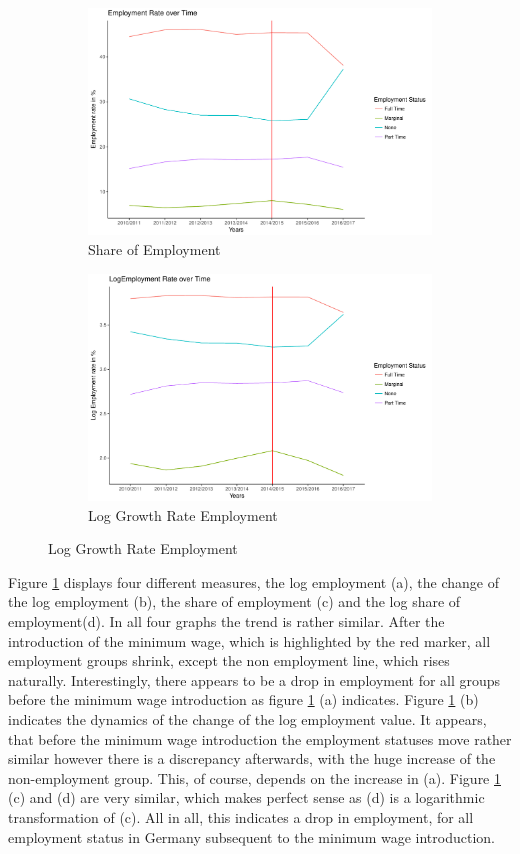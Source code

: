 \documentclass[a4paper]{article}
\begin{document}
\begin{figure}
\begin{subfigure}[h]{0.5\linewidth}
\includegraphics[width=\textwidth]{q4/yearemployrates.pdf}
\caption{Share of Employment}
\end{subfigure}
\hfill
\begin{subfigure}[h]{0.5\linewidth}
\includegraphics[width=\textwidth]{q4/yearlogemployrates.pdf}
\caption{Log Growth Rate Employment}
\end{subfigure}%
\label{q4graph1}
\end{figure}
%
%
Figure \ref{q4graph1} displays four different measures, the log employment (a), the change of the log employment (b), the share of employment (c) and the log share of employment(d). In all four graphs the trend is rather similar. After the introduction of the minimum wage, which is highlighted by the red marker, all employment groups shrink, except the non employment line, which rises naturally. Interestingly, there appears to be a drop in employment for all groups before the minimum wage introduction as figure \ref{q4graph1} (a) indicates. Figure \ref{q4graph1} (b) indicates the dynamics of the change of the log employment value. It appears, that before the minimum wage introduction the employment statuses move rather similar however there is a discrepancy afterwards, with the huge increase of the non-employment group. This, of course, depends on  the increase in (a). Figure \ref{q4graph1} (c) and (d) are very similar, which makes perfect sense as (d) is a logarithmic transformation of (c). All in all, this indicates a drop in employment, for all employment status in Germany subsequent to the minimum wage introduction.
\end{document}
